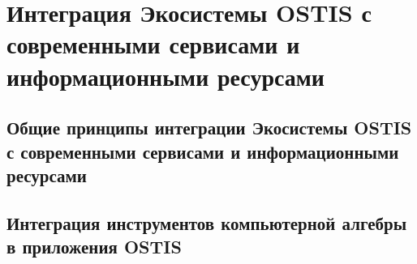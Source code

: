 \chapter{Интеграция Экосистемы OSTIS с современными сервисами и информационными ресурсами}
\label{chapter_integration}


\section{Общие принципы интеграции Экосистемы OSTIS с современными сервисами и информационными ресурсами}
\section{Интеграция инструментов компьютерной алгебры в приложения OSTIS}

%